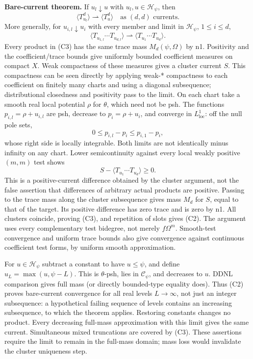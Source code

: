 \documentclass[
  11pt,
]{article}
\begin{document}
\textbf{Bare-current theorem.} If \(u_l\downarrow u\) with
\(u_l,u\in\mathcal{H}_\psi\), then \[
\langle T_{u_l}^d\rangle\rightharpoonup\langle T_u^d\rangle
\quad\text{as }(d,d)\text{ currents}. \tag{C2}
\] More generally, for \(u_{i,l}\downarrow u_i\) with every member and
limit in \(\mathcal{H}_\psi\), \(1\leq i\leq d\), \[
\langle T_{u_{1,l}}\cdots T_{u_{d,l}}\rangle
\rightharpoonup\langle T_{u_1}\cdots T_{u_d}\rangle. \tag{C3}
\] Every product in (C3) has the same trace mass \(M_d(\psi,\Omega)\) by
n1. Positivity and the coefficient/trace bounds give uniformly bounded
coefficient measures on compact \(X\). Weak compactness of these
measures gives a cluster current \(S\). This compactness can be seen
directly by applying weak-* compactness to each coefficient on finitely
many charts and using a diagonal subsequence; distributional closedness
and positivity pass to the limit. On each chart take a smooth real local
potential \(\rho\) for \(\theta\), which need not be psh. The functions
\(p_{i,l}=\rho+u_{i,l}\) are psh, decrease to \(p_i=\rho+u_i\), and
converge in \(L^1_{\mathrm{loc}}\): off the null pole sets, \[
0\leq p_{i,l}-p_i\leq p_{i,1}-p_i,
\] whose right side is locally integrable. Both limits are not
identically minus infinity on any chart. Lower semicontinuity against
every local weakly positive \((m,m)\) test shows \[
S-\langle T_{u_1}\cdots T_{u_d}\rangle\geq0.
\] This is a positive-current difference obtained by the cluster
argument, not the false assertion that differences of arbitrary actual
products are positive. Passing to the trace mass along the cluster
subsequence gives mass \(M_d\) for \(S\), equal to that of the target.
Its positive difference has zero trace and is zero by n1. All clusters
coincide, proving (C3), and repetition of slots gives (C2). The argument
uses every complementary test bidegree, not merely \(f\Omega^m\).
Smooth-test convergence and uniform trace bounds also give convergence
against continuous coefficient test forms, by uniform smooth
approximation.

For \(u\in\mathcal{H}_\psi\) subtract a constant to have \(u\leq\psi\),
and define \(u_L=\max(u,\psi-L)\). This is \(\theta\)-psh, lies in
\(\mathcal{C}_\psi\), and decreases to \(u\). DDNL comparison gives full
mass (or directly bounded-type equality does). Thus (C2) proves
bare-current convergence for all real levels \(L\to\infty\), not just an
integer subsequence: a hypothetical failing sequence of levels contains
an increasing subsequence, to which the theorem applies. Restoring
constants changes no product. Every decreasing full-mass approximation
with this limit gives the same current. Simultaneous mixed truncations
are covered by (C3). These assertions require the limit to remain in the
full-mass domain; mass loss would invalidate the cluster uniqueness
step.
\end{document}
